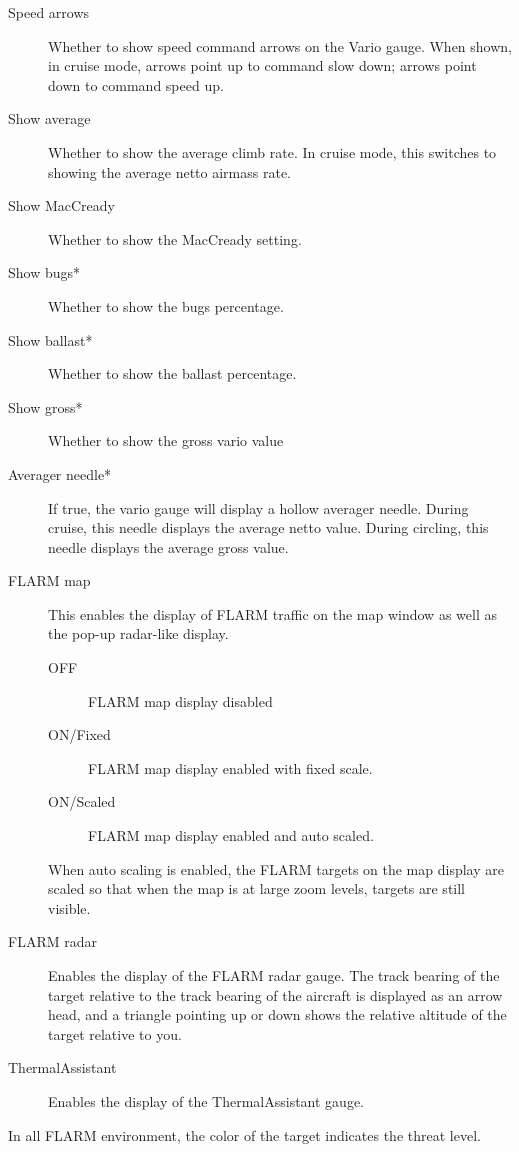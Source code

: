 \documentclass[a4paper,12pt]{refrep}
\begin{document}
\begin{description}
\item[Speed arrows] Whether to show speed command arrows on the Vario gauge.
When shown, in cruise mode, arrows point up to command slow down; arrows point down to command speed up.
\item[Show average]  Whether to show the average climb rate.  In cruise mode, this switches to showing the average netto airmass rate.
\item[Show MacCready] Whether to show the MacCready setting.
\item[Show bugs*] Whether to show the bugs percentage.
\item[Show ballast*] Whether to show the ballast percentage.
\item[Show gross*] Whether to show the gross vario value
\item[Averager needle*] If true, the vario gauge will display a hollow averager needle.  During cruise, this needle displays the average netto value.  During circling, this needle displays the average gross value.
\item[FLARM map] This enables the display of FLARM traffic on the map window as well as the pop-up radar-like display.
\begin{description}
\item[OFF] FLARM map display disabled
\item[ON/Fixed] FLARM map display enabled with fixed scale.
\item[ON/Scaled] FLARM map display enabled and auto scaled.
\end{description}
When auto scaling is enabled, the FLARM targets on the map display are scaled so that when the map is at large zoom levels, targets are still visible.
\item[FLARM radar] Enables the display of the FLARM radar gauge. The track bearing of the target relative to the track bearing of the aircraft is displayed as an arrow head, and a triangle pointing up or down shows the relative altitude of the target relative to you. 
\item[ThermalAssistant] Enables the display of the ThermalAssistant gauge.
\end{description}
In all FLARM environment, the color of the target indicates the threat level.

\end{document}
